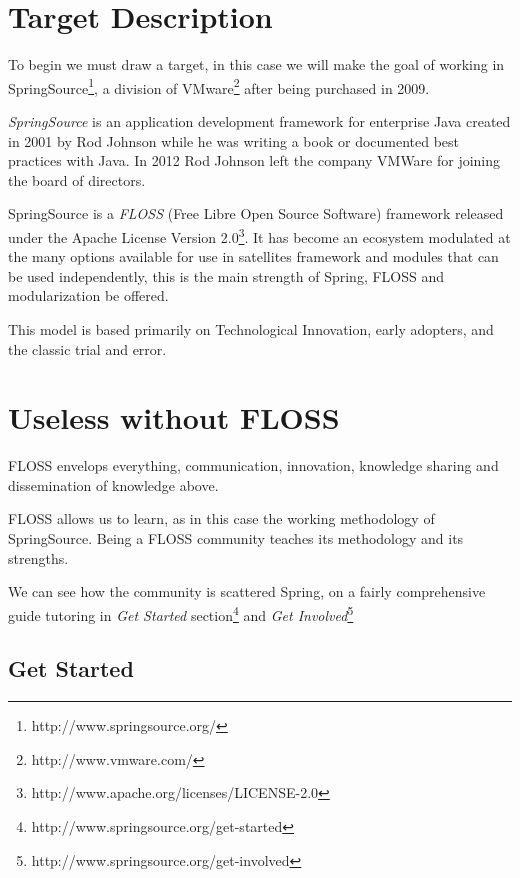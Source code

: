 \documentclass[11pt]{scrartcl}
\begin{document}
\section{Target Description}

\par To begin we must draw a target, in this case we will make the goal of working in SpringSource\footnote{http://www.springsource.org/}, a division of VMware\footnote{http://www.vmware.com/} after being purchased in 2009.

\par \emph{SpringSource} is an application development framework for enterprise Java created in 2001 by Rod Johnson while he was writing a book or documented best practices with Java. In 2012 Rod Johnson left the company VMWare for joining the board of directors.

\par SpringSource is a \emph{FLOSS} (Free Libre Open Source Software) framework released under the Apache License Version 2.0\footnote{http://www.apache.org/licenses/LICENSE-2.0}. It has become an ecosystem modulated at the many options available for use in satellites framework and modules that can be used independently, this is the main strength of Spring, FLOSS and modularization be offered.

\par This model is based primarily on Technological Innovation, early adopters, and the classic trial and error.

\section{Useless without FLOSS}

\par FLOSS envelops everything, communication, innovation, knowledge sharing and dissemination of knowledge above.

FLOSS allows us to learn, as in this case the working methodology of SpringSource. Being a FLOSS community teaches its methodology and its strengths.

We can see how the community is scattered Spring, on a fairly comprehensive guide tutoring in \emph{Get Started} section\footnote{http://www.springsource.org/get-started} and \emph{Get Involved}\footnote{http://www.springsource.org/get-involved}

\subsection{Get Started}
\end{document}
